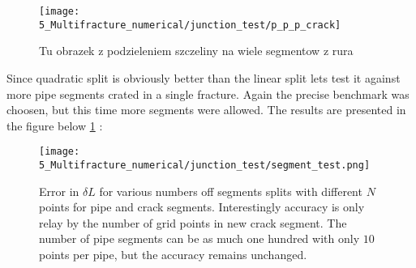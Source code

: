 \begin{figure}[H]
  \centering
      \texttt{[image: 5\_Multifracture\_numerical/junction\_test/p\_p\_p\_crack]}
  \caption{Tu obrazek z podzieleniem szczeliny na wiele segmentow z rura}
\end{figure}

Since quadratic split is obviously better than the linear split lets test it against more pipe segments crated in a single fracture. Again the precise benchmark was choosen, but this time more segments were allowed. The results are presented in the figure below \ref{L_segments} :

\begin{figure}[H]
	\centering
	\texttt{[image: 5\_Multifracture\_numerical/junction\_test/segment\_test.png]}
	\caption{Error in $\delta L$ for various numbers off segments splits with different $N$ points for pipe and crack segments. Interestingly accuracy is only relay by the number of grid points in new crack segment. The number of pipe segments can be as much one hundred with only $10$ points per pipe, but the accuracy remains unchanged.}
	\label{L_segments}
\end{figure}
 




